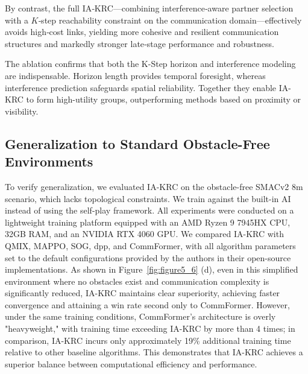 \documentclass[10pt]{article} %
\begin{document}
By contrast, the full IA‑KRC—combining interference‑aware partner selection with a $K$‑step reachability constraint on the communication domain—effectively avoids high‑cost links, yielding more cohesive and resilient communication structures and markedly stronger late‑stage performance and robustness.

The ablation confirms that both the K-Step horizon and interference modeling are indispensable. Horizon length provides temporal foresight, whereas interference prediction safeguards spatial reliability. Together they enable IA-KRC to form high-utility groups, outperforming methods based on proximity or visibility.

\subsection{Generalization to Standard Obstacle-Free Environments}

To verify generalization, we evaluated IA-KRC on the obstacle-free SMACv2 8m scenario, which lacks topological constraints. We train against the built-in AI instead of using the self-play framework. All experiments were conducted on a lightweight training platform equipped with an AMD Ryzen 9 7945HX CPU, 32GB RAM, and an NVIDIA RTX 4060 GPU. We compared IA-KRC with QMIX, MAPPO, SOG, dpp, and CommFormer, with all algorithm parameters set to the default configurations provided by the authors in their open-source implementations.
As shown in Figure~\ref{fig:figure5_6} (d), even in this simplified environment where no obstacles exist and communication complexity is significantly reduced, IA-KRC maintains clear superiority, achieving faster convergence and attaining a win rate second only to CommFormer. However, under the same training conditions, CommFormer's architecture is overly "heavyweight," with training time exceeding IA-KRC by more than 4 times; in comparison, IA-KRC incurs only approximately 19\% additional training time relative to other baseline algorithms. This demonstrates that IA-KRC achieves a superior balance between computational efficiency and performance.
\end{document}
